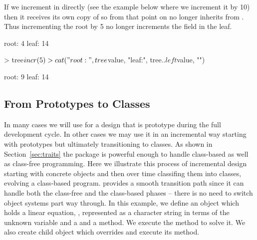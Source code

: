 \documentclass{Z}
\begin{document}
If we increment  in  directly (see the example
below where we increment it by 10) then it receives its own copy of
 so from that point on  no longer inherits
 from .  Thus incrementing the root by 5 no
longer increments the  field in the leaf.

\begin{Schunk}
\begin{Soutput}
root: 4 leaf: 14 
\end{Soutput}
\begin{Sinput}
> tree$incr(5)
> cat("root:", tree$value, "leaf:", tree$..left$value, "\n")
\end{Sinput}
\begin{Soutput}
root: 9 leaf: 14 
\end{Soutput}
\end{Schunk}

\subsection{From Prototypes to Classes}
\label{sec:increment}

In many cases we will use  for a design that is prototype
during the full development cycle.  In other cases we may use it in an
incremental way starting with prototypes but ultimately transitioning
to classes.
As shown in Section~\ref{sec:traits} the  package is
powerful enough to handle class-based as well as class-free programming.
Here we illustrate this process of incremental design 
starting with
concrete objects and then over time classifing them into classes,
evolving a class-based program.   provides a smooth
transition path since it can handle both the class-free and the class-based
phases -- there is no need to switch object systems part way through.
In this example, we define an object which holds a linear equation, ,
represented as a character string in terms of the unknown variable 
and a  and a  method.  We execute the 
 method 
to solve it.  We also create child object 
which overrides  and execute its  method.
\end{document}
